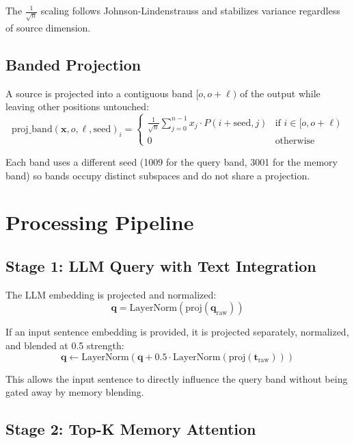 \documentclass[12pt]{article}
\begin{document}
The $\frac{1}{\sqrt{n}}$ scaling follows Johnson-Lindenstrauss and
stabilizes variance regardless of source dimension.

\subsection{Banded Projection}

A source is projected into a contiguous band $[o, o + \ell)$ of the
output while leaving other positions untouched:
\begin{equation}
\text{proj\_band}(\mathbf{x}, o, \ell, \text{seed})_i =
\begin{cases}
\frac{1}{\sqrt{n}} \sum_{j=0}^{n-1} x_j \cdot P(i + \text{seed}, j)
&\text{if } i \in [o, o+\ell) \\
0 &\text{otherwise}
\end{cases}
\end{equation}

Each band uses a different seed (1009 for the query band, 3001 for the
memory band) so bands occupy distinct subspaces and do not share a
projection.

\section{Processing Pipeline}

\subsection{Stage 1: LLM Query with Text Integration}

The LLM embedding is projected and normalized:
\begin{equation}
\mathbf{q} = \text{LayerNorm}(\text{proj}(\mathbf{q}_{\text{raw}}))
\end{equation}

If an input sentence embedding is provided, it is projected separately,
normalized, and blended at 0.5 strength:
\begin{equation}
\mathbf{q} \leftarrow \text{LayerNorm}(\mathbf{q} +
0.5 \cdot \text{LayerNorm}(\text{proj}(\mathbf{t}_{\text{raw}})))
\end{equation}

This allows the input sentence to directly influence the query band
without being gated away by memory blending.

\subsection{Stage 2: Top-K Memory Attention}
\end{document}
